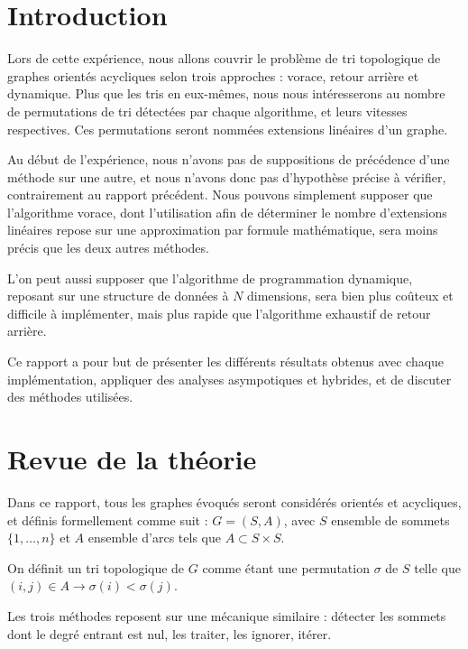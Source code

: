 \documentclass[10pt,a4paper]{article}
\begin{document}
\newpage

\hfill

\newpage

\tableofcontents

\newpage

\section{Introduction}

Lors de cette expérience, nous allons couvrir le problème de tri topologique de graphes orientés acycliques selon trois approches : vorace, retour arrière et dynamique. Plus que les tris en eux-mêmes, nous nous intéresserons au nombre de permutations de tri détectées par chaque algorithme, et leurs vitesses respectives. Ces permutations seront nommées \og extensions linéaires \fg d'un graphe.

Au début de l'expérience, nous n'avons pas de suppositions de précédence d'une méthode sur une autre, et nous n'avons donc pas d'hypothèse précise à vérifier, contrairement au rapport précédent. Nous pouvons simplement supposer que l'algorithme vorace, dont l'utilisation afin de déterminer le nombre d'extensions linéaires repose sur une approximation par formule mathématique, sera moins précis que les deux autres méthodes.

L'on peut aussi supposer que l'algorithme de programmation dynamique, reposant sur une structure de données à $N$ dimensions, sera bien plus coûteux et difficile à implémenter, mais plus rapide que l'algorithme exhaustif de retour arrière.

Ce rapport a pour but de présenter les différents résultats obtenus avec chaque implémentation, appliquer des analyses asympotiques et hybrides, et de discuter des méthodes utilisées.

\section{Revue de la théorie}

Dans ce rapport, tous les graphes évoqués seront considérés orientés et acycliques, et définis formellement comme suit : $ G = (S,A) $, avec $S$ ensemble de sommets $\{1, \ldots, n\}$ et $A$ ensemble d'arcs tels que $ A \subset S \times S $.

On définit un tri topologique de $G$ comme étant une permutation $ \sigma $ de $ S $ telle que $ (i,j) \in A \longrightarrow \sigma(i) < \sigma(j) $.

Les trois méthodes reposent sur une mécanique similaire : détecter les sommets dont le degré entrant est nul, les traiter, les ignorer, itérer.
\end{document}
